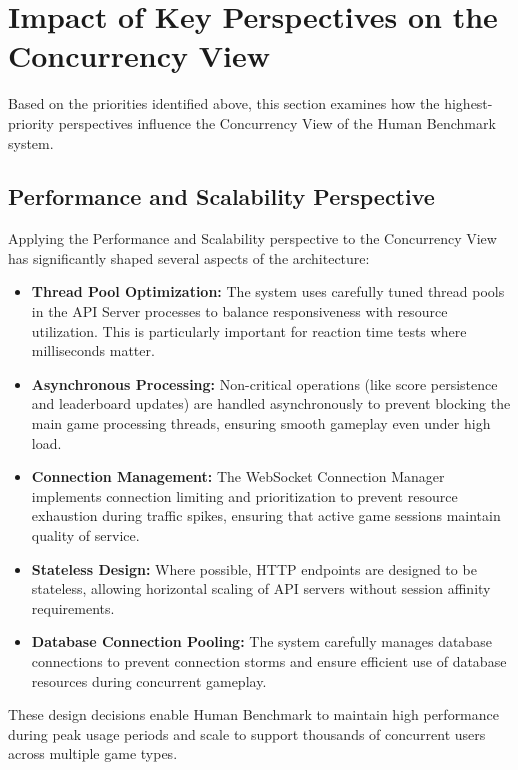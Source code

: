 \section{Impact of Key Perspectives on the Concurrency View}

Based on the priorities identified above, this section examines how the highest-priority perspectives influence the Concurrency View of the Human Benchmark system.

\subsection{Performance and Scalability Perspective}

Applying the Performance and Scalability perspective to the Concurrency View has significantly shaped several aspects of the architecture:

\begin{itemize}
    \item \textbf{Thread Pool Optimization:} The system uses carefully tuned thread pools in the API Server processes to balance responsiveness with resource utilization. This is particularly important for reaction time tests where milliseconds matter.
    
    \item \textbf{Asynchronous Processing:} Non-critical operations (like score persistence and leaderboard updates) are handled asynchronously to prevent blocking the main game processing threads, ensuring smooth gameplay even under high load.
    
    \item \textbf{Connection Management:} The WebSocket Connection Manager implements connection limiting and prioritization to prevent resource exhaustion during traffic spikes, ensuring that active game sessions maintain quality of service.
    
    \item \textbf{Stateless Design:} Where possible, HTTP endpoints are designed to be stateless, allowing horizontal scaling of API servers without session affinity requirements.
    
    \item \textbf{Database Connection Pooling:} The system carefully manages database connections to prevent connection storms and ensure efficient use of database resources during concurrent gameplay.
\end{itemize}

These design decisions enable Human Benchmark to maintain high performance during peak usage periods and scale to support thousands of concurrent users across multiple game types.


